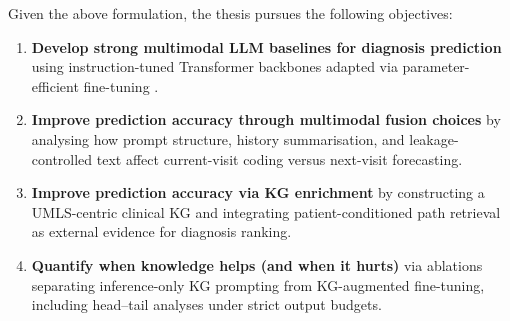 Given the above formulation, the thesis pursues the following objectives:
\begin{enumerate}
    \item \textbf{Develop strong multimodal LLM baselines for diagnosis prediction} using instruction-tuned Transformer backbones \cite{vaswani2017attention,ouyang2022training,touvron2023llama} adapted via parameter-efficient fine-tuning \cite{hu2021lora}.
    \item \textbf{Improve prediction accuracy through multimodal fusion choices} by analysing how prompt structure, history summarisation, and leakage-controlled text affect current-visit coding versus next-visit forecasting.
    \item \textbf{Improve prediction accuracy via KG enrichment} by constructing a UMLS-centric clinical KG \cite{bodenreider2004umls} and integrating patient-conditioned path retrieval as external evidence for diagnosis ranking.
    \item \textbf{Quantify when knowledge helps (and when it hurts)} via ablations separating inference-only KG prompting from KG-augmented fine-tuning, including head--tail analyses under strict output budgets.
\end{enumerate}



